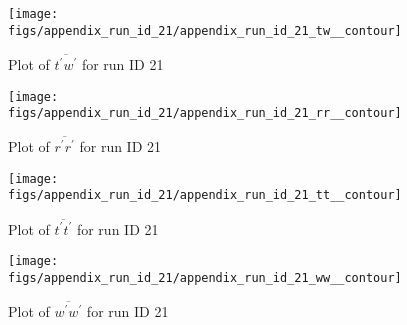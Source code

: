 \begin{figure}[H]
\centering
\texttt{[image: figs/appendix\_run\_id\_21/appendix\_run\_id\_21\_tw\_\_contour]}
\caption{Plot of $\overline{t^\prime w^\prime}$ for run ID 21}
\label{fig:appendix_run_id_21_tw__contour}
\end{figure}


\begin{figure}[H]
\centering
\texttt{[image: figs/appendix\_run\_id\_21/appendix\_run\_id\_21\_rr\_\_contour]}
\caption{Plot of $\overline{r^\prime r^\prime}$ for run ID 21}
\label{fig:appendix_run_id_21_rr__contour}
\end{figure}


\begin{figure}[H]
\centering
\texttt{[image: figs/appendix\_run\_id\_21/appendix\_run\_id\_21\_tt\_\_contour]}
\caption{Plot of $\overline{t^\prime t^\prime}$ for run ID 21}
\label{fig:appendix_run_id_21_tt__contour}
\end{figure}


\begin{figure}[H]
\centering
\texttt{[image: figs/appendix\_run\_id\_21/appendix\_run\_id\_21\_ww\_\_contour]}
\caption{Plot of $\overline{w^\prime w^\prime}$ for run ID 21}
\label{fig:appendix_run_id_21_ww__contour}
\end{figure}


